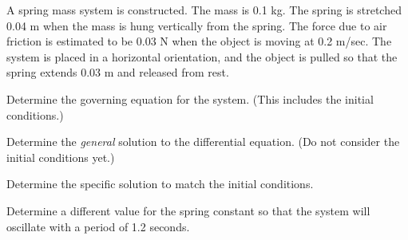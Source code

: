 


  \begin{problem}

  \item A spring mass system is constructed. The mass is 0.1 kg. The
    spring is stretched 0.04 m when the mass is hung vertically from
    the spring. The force due to air friction is estimated to be 0.03
    N when the object is moving at 0.2 m/sec. The system is placed in
    a horizontal orientation, and the object is pulled so that the
    spring extends 0.03 m and released from rest.

    \begin{subproblem}
      \item Determine the governing equation for the system. (This
        includes the initial conditions.)
        \vfill

      \item Determine the \textit{general} solution to the differential
        equation. (Do not consider the initial conditions yet.)
        \vfill

        \clearpage

      \item Determine the specific solution to match the initial conditions.

        \vfill

      \item Determine a different value for the spring constant so
        that the system will oscillate with a period of 1.2 seconds.
        \vfill

    \end{subproblem}



  \end{problem}



